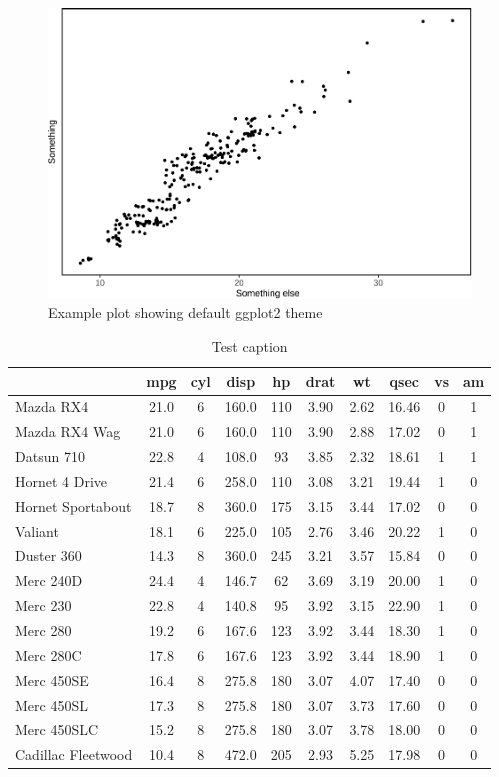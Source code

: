 \documentclass[a4paper, notitlepage]{extreport}
\begin{document}
\begin{figure}[tb]

{\centering \includegraphics[width=.75\linewidth]{skeleton_files/figure-latex/plot-1} 

}

\caption{Example plot showing default ggplot2 theme}\label{fig:plot}
\end{figure}

\lipsum

\begin{table}

\caption{\label{tab:table_1}Test caption}
\centering
\fontsize{9}{11}\selectfont
\begin{tabular}[t]{lccccccccc}
\toprule
\textbf{ } & \textbf{mpg} & \textbf{cyl} & \textbf{disp} & \textbf{hp} & \textbf{drat} & \textbf{wt} & \textbf{qsec} & \textbf{vs} & \textbf{am}\\
\midrule
Mazda RX4 & 21.0 & 6 & 160.0 & 110 & 3.90 & 2.62 & 16.46 & 0 & 1\\
Mazda RX4 Wag & 21.0 & 6 & 160.0 & 110 & 3.90 & 2.88 & 17.02 & 0 & 1\\
Datsun 710 & 22.8 & 4 & 108.0 & 93 & 3.85 & 2.32 & 18.61 & 1 & 1\\
Hornet 4 Drive & 21.4 & 6 & 258.0 & 110 & 3.08 & 3.21 & 19.44 & 1 & 0\\
Hornet Sportabout & 18.7 & 8 & 360.0 & 175 & 3.15 & 3.44 & 17.02 & 0 & 0\\
Valiant & 18.1 & 6 & 225.0 & 105 & 2.76 & 3.46 & 20.22 & 1 & 0\\
Duster 360 & 14.3 & 8 & 360.0 & 245 & 3.21 & 3.57 & 15.84 & 0 & 0\\
Merc 240D & 24.4 & 4 & 146.7 & 62 & 3.69 & 3.19 & 20.00 & 1 & 0\\
Merc 230 & 22.8 & 4 & 140.8 & 95 & 3.92 & 3.15 & 22.90 & 1 & 0\\
Merc 280 & 19.2 & 6 & 167.6 & 123 & 3.92 & 3.44 & 18.30 & 1 & 0\\
Merc 280C & 17.8 & 6 & 167.6 & 123 & 3.92 & 3.44 & 18.90 & 1 & 0\\
Merc 450SE & 16.4 & 8 & 275.8 & 180 & 3.07 & 4.07 & 17.40 & 0 & 0\\
Merc 450SL & 17.3 & 8 & 275.8 & 180 & 3.07 & 3.73 & 17.60 & 0 & 0\\
Merc 450SLC & 15.2 & 8 & 275.8 & 180 & 3.07 & 3.78 & 18.00 & 0 & 0\\
Cadillac Fleetwood & 10.4 & 8 & 472.0 & 205 & 2.93 & 5.25 & 17.98 & 0 & 0\\
\bottomrule
\end{tabular}
\end{table}
\end{document}
